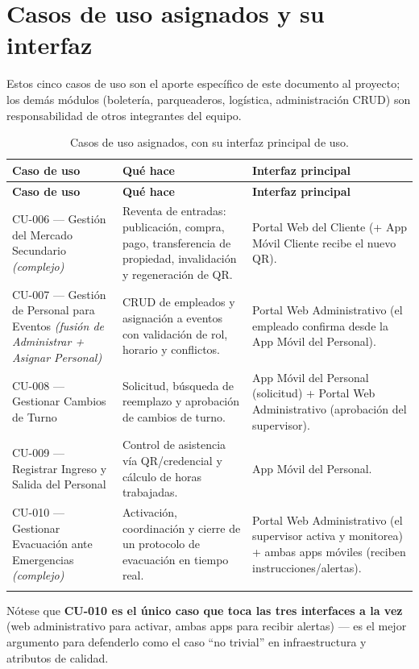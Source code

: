 \section{Casos de uso asignados y su interfaz}

Estos cinco casos de uso son el aporte específico de este documento al proyecto; los demás
módulos (boletería, parqueaderos, logística, administración CRUD) son responsabilidad de otros
integrantes del equipo.

\begin{longtable}{p{3.6cm}p{6.5cm}p{4.2cm}}
\toprule
\textbf{Caso de uso} & \textbf{Qué hace} & \textbf{Interfaz principal}\\
\midrule
\endfirsthead
\toprule
\textbf{Caso de uso} & \textbf{Qué hace} & \textbf{Interfaz principal}\\
\midrule
\endhead
CU-006 --- Gestión del Mercado Secundario \textit{(complejo)} &
Reventa de entradas: publicación, compra, pago, transferencia de propiedad, invalidación y
regeneración de QR. &
Portal Web del Cliente (+ App Móvil Cliente recibe el nuevo QR).\\[0.5em]
CU-007 --- Gestión de Personal para Eventos \textit{(fusión de Administrar + Asignar Personal)} &
CRUD de empleados y asignación a eventos con validación de rol, horario y conflictos. &
Portal Web Administrativo (el empleado confirma desde la App Móvil del Personal).\\[0.5em]
CU-008 --- Gestionar Cambios de Turno &
Solicitud, búsqueda de reemplazo y aprobación de cambios de turno. &
App Móvil del Personal (solicitud) + Portal Web Administrativo (aprobación del supervisor).\\[0.5em]
CU-009 --- Registrar Ingreso y Salida del Personal &
Control de asistencia vía QR/credencial y cálculo de horas trabajadas. &
App Móvil del Personal.\\[0.5em]
CU-010 --- Gestionar Evacuación ante Emergencias \textit{(complejo)} &
Activación, coordinación y cierre de un protocolo de evacuación en tiempo real. &
Portal Web Administrativo (el supervisor activa y monitorea) + ambas apps móviles (reciben
instrucciones/alertas).\\
\bottomrule
\caption{Casos de uso asignados, con su interfaz principal de uso.}
\end{longtable}

Nótese que \textbf{CU-010 es el único caso que toca las tres interfaces a la vez} (web
administrativo para activar, ambas apps para recibir alertas) --- es el mejor argumento para
defenderlo como el caso ``no trivial'' en infraestructura y atributos de calidad.


